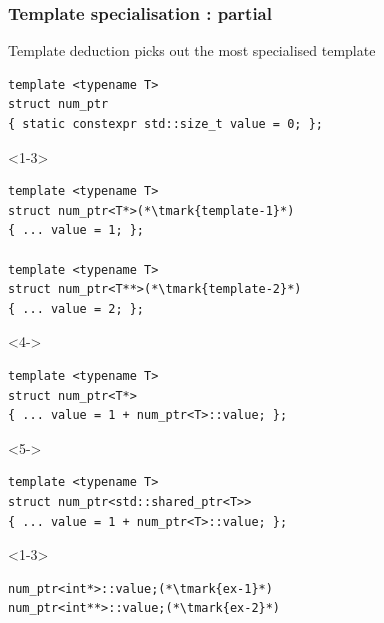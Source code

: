 \documentclass[14pt]{beamer}
\begin{document}
\begin{frame}[fragile]
  \frametitle{Template specialisation : partial}

    {\changefontsize{12pt}
    Template deduction picks out the most specialised template}

    \vspace*{-.25cm}
  
    \begin{overlayarea}{\textwidth}{5cm}
    \begin{lstlisting}[basicstyle=\codefontsize{10pt}]
template <typename T>
struct num_ptr
{ static constexpr std::size_t value = 0; };
  \end{lstlisting}

  \begin{onlyenv}<1-3>
    \begin{lstlisting}[basicstyle=\codefontsize{10pt}]
template <typename T>
struct num_ptr<T*>(*\tmark{template-1}*)
{ ... value = 1; };

template <typename T>
struct num_ptr<T**>(*\tmark{template-2}*)
{ ... value = 2; };
    \end{lstlisting}
  \end{onlyenv}

  \begin{onlyenv}<4->
    \begin{lstlisting}[basicstyle=\codefontsize{10pt}]
template <typename T>
struct num_ptr<T*>
{ ... value = 1 + num_ptr<T>::value; };
    \end{lstlisting}
  \end{onlyenv}

  \begin{onlyenv}<5->
    \begin{lstlisting}[basicstyle=\codefontsize{10pt}]
template <typename T>
struct num_ptr<std::shared_ptr<T>>
{ ... value = 1 + num_ptr<T>::value; };
    \end{lstlisting}
  \end{onlyenv}

  \end{overlayarea}

  \begin{overlayarea}{\textwidth}{2cm}
    \begin{onlyenv}<1-3>
      \begin{lstlisting}[basicstyle=\codefontsize{10pt}]
num_ptr<int*>::value;(*\tmark{ex-1}*)
num_ptr<int**>::value;(*\tmark{ex-2}*)
      \end{lstlisting}
    \end{onlyenv}


\end{overlayarea}
\end{frame}
\end{document}
